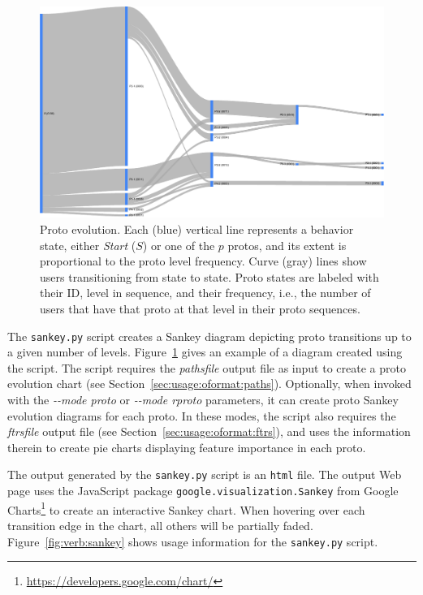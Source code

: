\documentclass[]{article}
\begin{document}
\begin{figure}[htp]
\begin{center}
  \includegraphics[width=0.9\columnwidth]{sankey}
  \caption{Proto evolution. Each (blue) vertical line represents a
behavior state, either \emph{Start} ($S$) or one of the $p$ protos, and its
extent is proportional to the proto level frequency. Curve (gray) lines show
users transitioning from state to state. Proto states are labeled with their ID,
level in sequence, and their frequency, i.e., the number of users that have that
proto at that level in their proto sequences.}
  \label{fig:sankey}
\end{center}
\end{figure}

The {\tt sankey.py} script creates a Sankey diagram depicting proto transitions
up to a given number of levels. Figure~\ref{fig:sankey} gives an example of a
diagram created using the script. The script requires the \emph{pathsfile}
\orionp output file as input to create a proto evolution chart (see
Section~\ref{sec:usage:oformat:paths}). Optionally, when invoked with the
\emph{-{}-mode proto} or \emph{-{}-mode rproto} parameters, it can create proto
Sankey evolution diagrams for each proto. In these modes, the script also
requires the \emph{ftrsfile} \orion output file (see
Section~\ref{sec:usage:oformat:ftrs}), and uses the information therein to
create pie charts displaying feature importance in each proto.

The output generated by the {\tt sankey.py} script is an {\tt html} file. The
output Web page uses the JavaScript package {\tt google.visualization.Sankey}
from Google
Charts\footnote{\href{https://developers.google.com/chart/}{https://developers.google.com/chart/}}
to create an interactive Sankey chart. When hovering over each transition edge
in the chart, all others will be partially faded. Figure~\ref{fig:verb:sankey}
shows usage information for the {\tt sankey.py} script.
\end{document}

